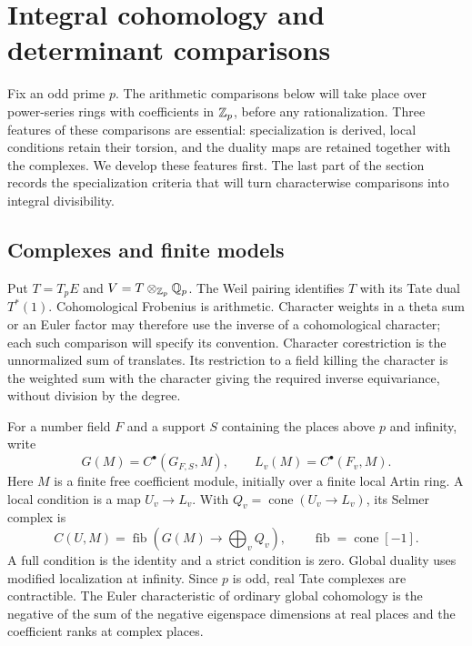 \section{Integral cohomology and determinant comparisons}\label{sec:models}

Fix an odd prime $p$.  The arithmetic comparisons below will take place
over power-series rings with coefficients in $\mathbb Z_p$, before any
rationalization.  Three features of these comparisons are essential:
specialization is derived, local conditions retain their torsion, and
the duality maps are retained together with the complexes.  We develop
these features first.  The last part of the section records the
specialization criteria that will turn characterwise comparisons into
integral divisibility.

\subsection{Complexes and finite models}

Put $T=T_pE$ and $V=T\otimes_{\mathbb Z_p}\mathbb Q_p$.  The Weil pairing identifies
$T$ with its Tate dual $T^*(1)$.  Cohomological Frobenius is arithmetic.
Character weights in a theta sum or an Euler factor may therefore use
the inverse of a cohomological character; each such comparison will
specify its convention.  Character corestriction is the unnormalized
sum of translates.  Its restriction to a field killing the character
is the weighted sum with the character giving the required inverse
equivariance, without division by the degree.

For a number field $F$ and a support $S$ containing the places above $p$
and infinity, write
\[
 G(M)=C^\bullet(G_{F,S},M),\qquad L_v(M)=C^\bullet(F_v,M).
\]
Here $M$ is a finite free coefficient module, initially over a finite
local Artin ring.  A local condition is a map $U_v\longrightarrow L_v$.
With $Q_v=\operatorname{cone}(U_v\to L_v)$, its Selmer complex is
\begin{equation}\label{models:selmer-complex}
 C(U,M)=\operatorname{fib}\left(G(M)\longrightarrow\bigoplus_vQ_v\right),
 \qquad \operatorname{fib}=\operatorname{cone}[-1].
\end{equation}
A full condition is the identity and a strict condition is zero.
Global duality uses modified localization at infinity.  Since $p$ is
odd, real Tate complexes are contractible.  The Euler characteristic
of ordinary global cohomology is the negative of the sum of the
negative eigenspace dimensions at real places and the coefficient
ranks at complex places.

